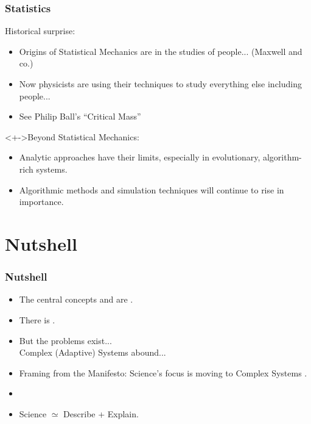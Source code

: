 \begin{frame}
  \frametitle{Statistics}

  \begin{block}{Historical surprise:}
  \begin{itemize}
  \item<+-> Origins of Statistical Mechanics are in the studies of people...
    (Maxwell and co.)
  \item<+-> Now physicists are using their techniques to study everything else
    including people...
  \item<+-> See Philip Ball's ``Critical Mass''\cite{ball2004a}
  \end{itemize}
  \end{block}

  \begin{block}<+->{Beyond Statistical Mechanics:}
    \begin{itemize}
    \item<+->
      Analytic approaches have their limits,
      especially in evolutionary, algorithm-rich systems.
    \item<+->
      Algorithmic methods and simulation techniques will continue
      to rise in importance.
    \end{itemize}
  \end{block}

\end{frame}

\section{Nutshell}

\begin{frame}
  \frametitle{Nutshell}

  \begin{block}{}
  \begin{itemize}
  \item<+->
    The central concepts  and
     are .
  \item<+->
    There is .
  \item<+->
    But the problems exist...\\
    \qquad \qquad Complex (Adaptive) Systems abound...
  \item<+->
    Framing from the Manifesto: Science's focus is moving to Complex Systems 
    .
  \item<+->
  \item<+->
    Science $\simeq$ Describe + Explain.
  \end{itemize}
  \end{block}

\end{frame}

